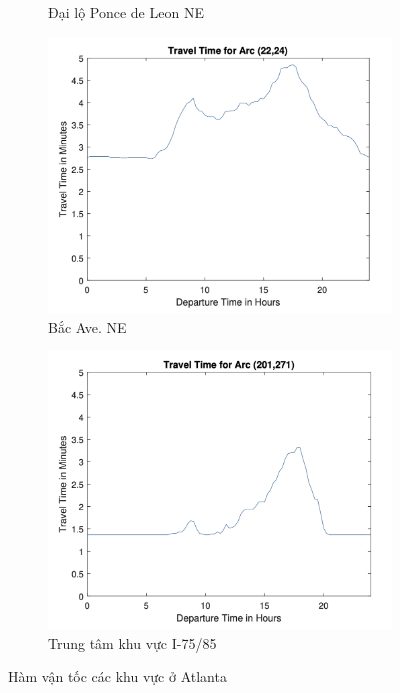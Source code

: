 \documentclass[../main.tex]{subfiles}
\begin{document}
\begin{figure}
\begin{subfigure}{0.45\textwidth}
        \caption{Đại lộ Ponce de Leon NE}
        \label{fig:15b}
    \end{subfigure}
    \begin{subfigure}{0.45\textwidth}
        \centering
        \includegraphics{edited-images/Figure15c.jpg}
        \caption{Bắc Ave. NE}
        \label{fig:15c}
    \end{subfigure}
    \begin{subfigure}{0.45\textwidth}
        \centering
        \includegraphics{edited-images/Figure15d.jpg}
        \caption{Trung tâm khu vực I-75/85}
        \label{fig:15d}
    \end{subfigure}
    \caption{Hàm vận tốc các khu vực ở Atlanta}
    \label{fig:15}
\end{figure}
\end{document}
